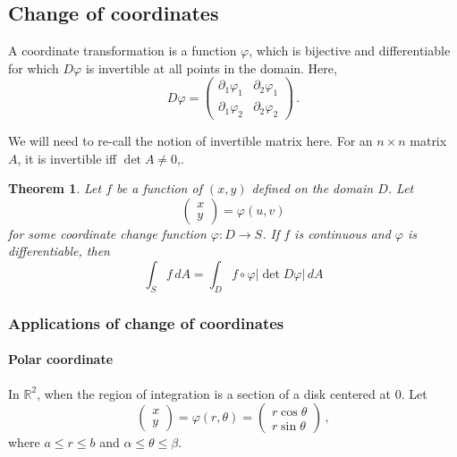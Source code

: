 \documentclass[
]{article}
\newtheorem{theorem}{Theorem}[section]
\theoremstyle{definition}
\theoremstyle{definition}
\theoremstyle{definition}
\theoremstyle{definition}
\theoremstyle{remark}
\begin{document}
\subsection{Change of coordinates}\label{change-of-coordinates}

A coordinate transformation is a function \(\varphi\), which
is bijective and differentiable for which \(D\varphi\) is
invertible at all points in the domain.
Here,
\begin{equation*}
    D\varphi = 
    \begin{pmatrix}
        \partial_1 \varphi_1 & \partial_2 \varphi_1 \\
        \partial_1 \varphi_2 & \partial_2 \varphi_2 
    \end{pmatrix} \,.
\end{equation*}

We will need to re-call the notion of invertible matrix here.
For an \(n\times n\) matrix \(A\), it is invertible iff \(\det A \not= 0\),.

\begin{theorem}
Let \(f\) be a function of \((x,y)\) defined on the domain \(D\).
Let
\begin{equation*}
    \begin{pmatrix}
        x \\ y
    \end{pmatrix}
     = \varphi(u,v)
\end{equation*}
for some coordinate change function \(\varphi: D \to S\).
If \(f\) is continuous and \(\varphi\) is differentiable, then
\begin{equation*}
    \int_S f \, dA = \int_D f\circ \varphi |\det D \varphi| \, dA
\end{equation*}
\end{theorem}

\subsubsection{Applications of change of coordinates}\label{applications-of-change-of-coordinates}

\paragraph{Polar coordinate}\label{polar-coordinate}

In \(\mathbb{R}^2\),
when the region of integration is a section of a disk centered at \(0\).
Let
\begin{equation*}
    \begin{pmatrix}
        x \\ y
    \end{pmatrix}
    =
    \varphi(r,\theta) = 
    \begin{pmatrix}
        r\cos\theta \\
        r\sin\theta 
    \end{pmatrix} \,,
\end{equation*}
where \(a \leq r \leq b\) and \(\alpha \leq \theta \leq \beta\).
\end{document}
